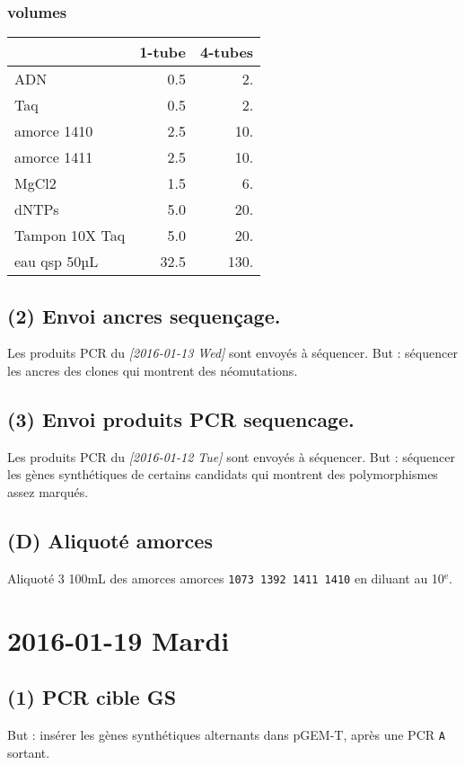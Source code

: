 \documentclass[9pt, oneside, twocolumn]{scrartcl}
\begin{document}
\subsubsection{volumes}
\label{sec:orgheadline47}
\begin{center}
\begin{tabular}{lrr}
\toprule
 & 1-tube & 4-tubes\\
\midrule
ADN & 0.5 & 2.\\
Taq & 0.5 & 2.\\
amorce 1410 & 2.5 & 10.\\
amorce 1411 & 2.5 & 10.\\
MgCl2 & 1.5 & 6.\\
dNTPs & 5.0 & 20.\\
Tampon 10X Taq & 5.0 & 20.\\
\midrule
eau qsp 50µL & 32.5 & 130.\\
\bottomrule
\end{tabular}
\end{center}

\subsection{(2) Envoi ancres sequençage.}
\label{sec:orgheadline49}
Les produits PCR du \textit{[2016-01-13 Wed] } sont envoyés à séquencer. But : séquencer
les ancres des clones qui montrent des néomutations. 
\subsection{(3) Envoi produits PCR sequencage.}
\label{sec:orgheadline50}
Les produits PCR du \textit{[2016-01-12 Tue] } sont envoyés à séquencer. But : séquencer
les gènes synthétiques de certains candidats qui montrent des polymorphismes
assez marqués. 
\subsection{(D) Aliquoté amorces}
\label{sec:orgheadline51}
Aliquoté 3\texttimes{} 100mL des amorces amorces \texttt{1073 1392 1411 1410} en diluant au
10\(^{\text{e}}\).
\section{2016-01-19 Mardi}
\label{sec:orgheadline58}
\subsection{(1) PCR cible GS}
\label{sec:orgheadline56}
But : insérer les gènes synthétiques alternants dans pGEM-T, après une PCR \texttt{A}
sortant. 
\end{document}
